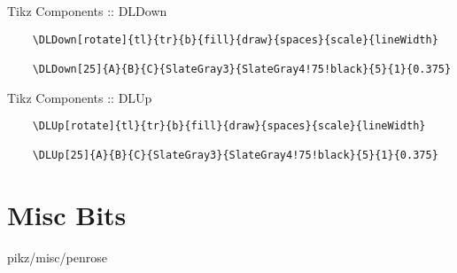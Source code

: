 \documentclass[9pt,xcolor={svgnames, x11names}]{beamer}
\begin{document}
\begin{frame}[fragile]{Tikz Components :: DLDown}

  \footnotesize
  \begin{verbatim}
    \DLDown[rotate]{tl}{tr}{b}{fill}{draw}{spaces}{scale}{lineWidth}

    \DLDown[25]{A}{B}{C}{SlateGray3}{SlateGray4!75!black}{5}{1}{0.375}
  \end{verbatim}


\end{frame}

\begin{frame}[fragile]{Tikz Components :: DLUp}

  \footnotesize
  \begin{verbatim}
    \DLUp[rotate]{tl}{tr}{b}{fill}{draw}{spaces}{scale}{lineWidth}

    \DLUp[25]{A}{B}{C}{SlateGray3}{SlateGray4!75!black}{5}{1}{0.375}
  \end{verbatim}


\end{frame}




\section{Misc Bits}


\begin{frame}{pikz/misc/penrose}
  
\end{frame}
\end{document}
